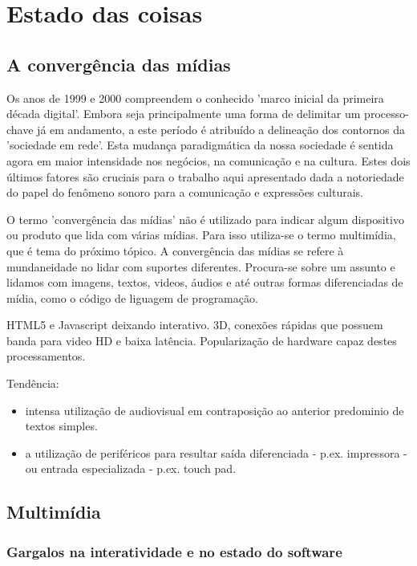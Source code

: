 \section{Estado das coisas}
\label{sec:context}


\subsection{A convergência das mídias}
\label{sec:midiamultimidia}

Os anos de 1999 e 2000 compreendem o conhecido 'marco inicial da primeira década digital'.
Embora seja principalmente uma forma de delimitar um processo-chave já em andamento, a este período é atribuído
a delineação dos contornos da 'sociedade em rede'. Esta mudança paradigmática da nossa
sociedade é sentida agora em maior intensidade nos negócios, na comunicação e na cultura. Estes dois
últimos fatores são cruciais para o trabalho aqui apresentado dada a notoriedade do papel do
fenômeno sonoro para a comunicação e expressões culturais.

O termo 'convergência das mídias' não é utilizado para indicar algum dispositivo ou produto que
lida com várias mídias. Para isso utiliza-se o termo multimídia, que é tema do próximo tópico.
A convergência das mídias se refere à mundaneidade no lidar com suportes diferentes. Procura-se
sobre um assunto e lidamos com imagens, textos, videos, áudios e até outras formas diferenciadas
de mídia, como o código de liguagem de programação.



HTML5 e Javascript deixando interativo. 3D, conexões rápidas que possuem banda para video HD e
baixa latência. Popularização de hardware capaz destes processamentos.

Tendência: 
\begin{itemize}
    \item intensa utilização de audiovisual em contraposição ao
anterior predominio de textos simples.
    \item a utilização de periféricos para resultar saída diferenciada - p.ex.
impressora - ou entrada especializada - p.ex. touch pad.
\end{itemize}


\subsection{Multimídia}

\subsubsection{Gargalos na interatividade e no estado do software}
\label{sec:gargalos}

